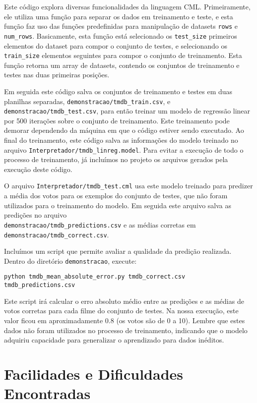 \documentclass[12pt]{article}
\begin{document}
Este código explora diversas funcionalidades da linguagem CML.  Primeiramente, ele utiliza uma função para separar os dados em treinamento e teste, e esta função faz uso das funções predefinidas para manipulação de datasets \texttt{rows} e \texttt{num\_rows}. Basicamente, esta função está selecionado os \texttt{test\_size} primeiros elementos do dataset para compor o conjunto de testes, e selecionando os \texttt{train\_size} elementos seguintes para compor o conjunto de treinamento. Esta função retorna um array de datasets, contendo os conjuntos de treinamento e testes nas duas primeiras posições.

Em seguida este código salva os conjuntos de treinamento e testes em duas planilhas separadas, \texttt{demonstracao/tmdb\_train.csv}, e \texttt{demonstracao/tmdb\_test.csv}, para então treinar um modelo de regressão linear por 500 iterações sobre o conjunto de treinamento. Este treinamento pode demorar dependendo da máquina em que o código estiver sendo executado. Ao final do treinamento, este código salva as informações do modelo treinado no arquivo \texttt{Interpretador/tmdb\_linreg.model}. Para evitar a execução de todo o processo de treinamento, já incluímos no projeto os arquivos gerados pela execução deste código.

O arquivo \texttt{Interpretador/tmdb\_test.cml} usa este modelo treinado para predizer a média dos votos para os exemplos do conjunto de testes, que não foram utilizados para o treinamento do modelo. Em seguida este arquivo salva as predições no arquivo\\ \texttt{demonstracao/tmdb\_predictions.csv} e as médias corretas em \texttt{demonstracao/tmdb\_correct.csv}.

Incluímos um script que permite avaliar a qualidade da predição realizada. Dentro do diretório \texttt{demonstracao}, execute:

\begin{verbatim}
python tmdb_mean_absolute_error.py tmdb_correct.csv tmdb_predictions.csv
\end{verbatim}

Este script irá calcular o erro absoluto médio entre as predições e as médias de votos corretas para cada filme do conjunto de testes. Na nossa execução, este valor ficou em aproximadamente 0.8 (os votos são de 0 a 10). Lembre que estes dados não foram utilizados no processo de treinamento, indicando que o modelo adquiriu capacidade para generalizar o aprendizado para dados inéditos.

\section{Facilidades e Dificuldades Encontradas}
\end{document}
